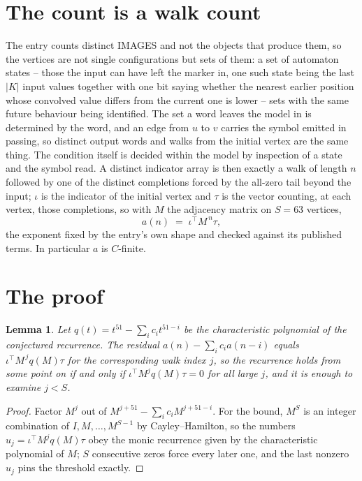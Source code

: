 \documentclass[11pt,a4paper]{article}
\theoremstyle{plain}
\newtheorem{lemma}[theorem]{Lemma}
\theoremstyle{definition}
\begin{document}
\section{The count is a walk count}

The entry counts distinct IMAGES and not the objects that produce them, so the vertices are not single configurations but sets of them: a set of automaton states -- those the input can have left the marker in, one such state being the last $|K|$ input values together with one bit saying whether the nearest earlier position whose convolved value differs from the current one is lower -- sets with the same future behaviour being identified. The set a word leaves the model in is determined by the word, and an edge from $u$ to $v$ carries the symbol emitted in passing, so distinct output words and walks from the initial vertex are the same thing. The condition itself is decided within the model by inspection of a state and the symbol read.
A distinct indicator array is then exactly a walk of length $n$ followed by one of the distinct completions forced by the all-zero tail beyond the input; $\iota$ is the indicator of the initial vertex and $\tau$ is the vector counting, at each vertex, those completions, so with $M$ the adjacency matrix on $S=63$ vertices,
\[
a(n)\;=\;\iota^{\!\top}M^{\,n}\tau ,
\]
the exponent fixed by the entry's own shape and checked against its published terms. In
particular $a$ is $C$-finite.

\section{The proof}

\begin{lemma}\label{lem:crit}
Let $q(t)=t^{51}-\sum_i c_it^{51-i}$ be the characteristic polynomial of the
conjectured recurrence. The residual $a(n)-\sum_ic_ia(n-i)$ equals
$\iota^{\!\top}M^{\,j}q(M)\tau$ for the corresponding walk index $j$, so the recurrence
holds from some point on if and only if $\iota^{\!\top}M^{j}q(M)\tau=0$ for all large $j$,
and it is enough to examine $j<S$.
\end{lemma}

\begin{proof}
Factor $M^{j}$ out of $M^{j+51}-\sum_ic_iM^{j+51-i}$. For the bound, $M^{S}$
is an integer combination of $I,M,\dots,M^{S-1}$ by Cayley--Hamilton, so the numbers
$u_j=\iota^{\!\top}M^{j}q(M)\tau$ obey the monic recurrence given by the characteristic
polynomial of $M$; $S$ consecutive zeros force every later one, and the last nonzero $u_j$
pins the threshold exactly.
\end{proof}
\end{document}
